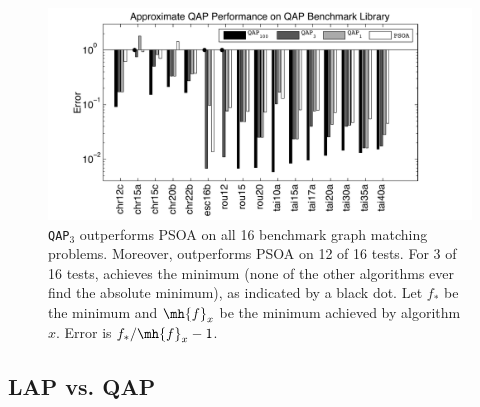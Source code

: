 \documentclass[10pt,journal,cspaper,compsoc]{IEEEtran}
\begin{document}
\begin{figure}[htbp]
	\centering			
	\includegraphics[width=1.0\linewidth]{../figs/benchmarks.pdf}
	\caption{\texttt{QAP}$_3$ outperforms PSOA on all 16 benchmark graph matching problems.  Moreover, \qapa outperforms PSOA on 12 of 16 tests.  For 3 of 16 tests, \qapb achieves the minimum (none of the other algorithms ever find the absolute minimum), as indicated by a black dot.  Let $f_*$ be the minimum and $\mh{f}_x$ be the minimum achieved by algorithm $x$.  Error is $f_*/\mh{f}_x-1$.  }
	\label{fig:fwpath}
\end{figure}





\subsection{LAP vs. QAP} %
\label{sub:lap_vs_qap}
\end{document}
